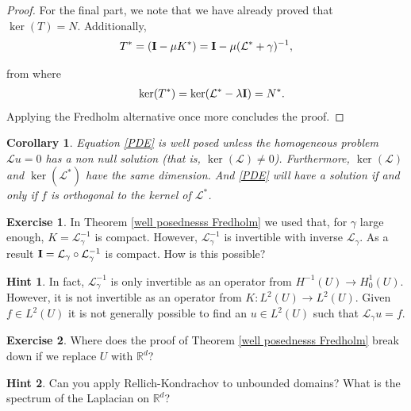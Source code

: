 \documentclass[
    a4paper,
    DIV=14,
    abstract=true,
    numbers=noenddot
]
{scrartcl}
\newtheorem{corollary}[theorem]{Corollary}
\theoremstyle{definition}
\newtheorem{exercise}{Exercise}
\newtheorem*{hint}{Hint}
\newcommand{\R}{\mathbb{R}}
\newcommand{\Ll}{\mathcal{L}}
\begin{document}
\begin{proof}
	For the final part, we note that we have already proved that $\ker(T)=N$. Additionally,
	\begin{align*}
		T^* =(\vb{I}-\mu K^*) =\vb{I}-\mu (\Ll^*+ \gamma  )^{-1},
	\end{align*}

	from where
	\begin{align*}
		\quad \ker(T^*)=\ker(\Ll^* -\lambda \vb{I})= N^*.
	\end{align*}
	Applying the Fredholm alternative once more concludes the proof.
\end{proof}

\begin{corollary}
	Equation \eqref{PDE} is well posed unless the homogeneous problem $\Ll u=0$ has a non null solution (that is, $\ker(\Ll )\neq 0$). Furthermore,  $\ker(\Ll) $ and $\ker(\Ll ^*)$ have the same dimension.  And \eqref{PDE} will have a solution if and only if $f$ is orthogonal to the kernel of $\Ll^*$.
\end{corollary}


\begin{exercise}
	In Theorem \ref{well posednesss Fredholm} we used that, for $\gamma $ large enough,  $K= \Ll_{\gamma }^{-1} $ is compact. However, $\Ll_{\gamma }^{-1}$ is invertible with inverse $\Ll _\gamma $. As a result $\vb{I}=\Ll _\gamma \circ \Ll _\gamma ^{-1}$  is compact. How is this possible?
\end{exercise}
\begin{hint}
	In fact, $\Ll_\gamma^{-1} $ is only invertible as an operator from $H^{-1}(U) \to H^1_0(U)$. However, it is not invertible as an operator from $K:L^2(U) \to L^2(U)$. Given $f \in L^2(U)$ it is not generally possible to find an $u \in L^2(U)$ such that $\Ll_\gamma u =f$.
\end{hint}
\begin{exercise}
	Where does the proof of Theorem \ref{well posednesss Fredholm} break down if we replace $U$ with $\R^d$?
\end{exercise}
\begin{hint}
	Can you apply Rellich-Kondrachov to unbounded domains? What is the spectrum of the Laplacian on $\R^d$?
\end{hint}
\end{document}
